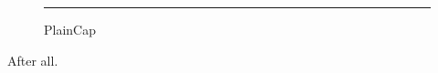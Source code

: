 \documentclass{article}
\begin{document}
\begin{figure}
\centering
\rule{2cm}{1cm}
\caption{PlainCap}
\end{figure}
After all.
\end{document}
